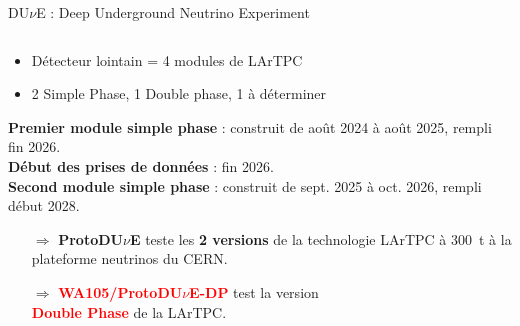 \begin{frame}{DU$\nu$E : Deep Underground Neutrino Experiment}
\begin{scriptsize}
\begin{columns}
\begin{column}{0.45\textwidth}
                    \begin{itemize}
                        \item Détecteur lointain = 4 modules de LArTPC
                        \item 2 Simple Phase, 1 Double phase, 1 à déterminer
                    \end{itemize}
                    \textbf{Premier module simple phase} : construit de août 2024 à août 2025, rempli fin 2026.\\
                    \textbf{Début des prises de données} : fin 2026.\\
                    \textbf{Second module simple phase} : construit de sept. 2025 à oct. 2026, rempli début 2028.\\
                    \begin{itemize}
                        \item[$\Rightarrow$] \textbf{ProtoDU$\nu$E} teste les \textbf{2 versions} de la technologie LArTPC  à \SI{300}{\tonne} à la plateforme neutrinos du CERN.\\
                        \item[$\Rightarrow$]\textcolor{red}{\textbf{WA105/ProtoDU$\nu$E-DP}} test la version\\ \textcolor{red}{\textbf{Double Phase}} de la LArTPC.\\
                    \end{itemize}
                \end{column}
            \end{columns}
        \end{scriptsize}
    \end{frame}
    

